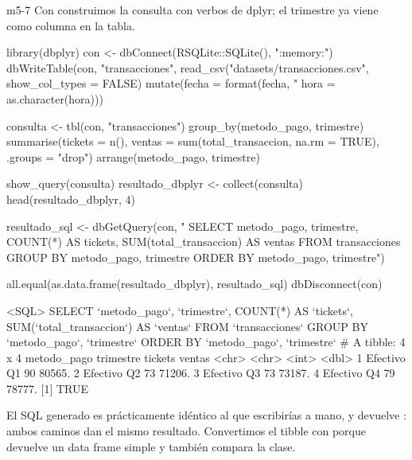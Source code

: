 \begin{solucion}{m5-7}
Con  construimos la consulta con verbos de dplyr; el
trimestre ya viene como columna en la tabla.

\begin{rcode}
library(dbplyr)
con <- dbConnect(RSQLite::SQLite(), ":memory:")
dbWriteTable(con, "transacciones",
             read_csv("datasets/transacciones.csv",
                      show_col_types = FALSE) %
               mutate(fecha = format(fecha, "%
                      hora = as.character(hora)))

consulta <- tbl(con, "transacciones") %
  group_by(metodo_pago, trimestre) %
  summarise(tickets = n(),
            ventas  = sum(total_transaccion, na.rm = TRUE),
            .groups = "drop") %
  arrange(metodo_pago, trimestre)

show_query(consulta)
resultado_dbplyr <- collect(consulta)
head(resultado_dbplyr, 4)

resultado_sql <- dbGetQuery(con, "
  SELECT metodo_pago, trimestre, COUNT(*) AS tickets,
         SUM(total_transaccion) AS ventas
  FROM transacciones
  GROUP BY metodo_pago, trimestre
  ORDER BY metodo_pago, trimestre")

all.equal(as.data.frame(resultado_dbplyr), resultado_sql)
dbDisconnect(con)
\end{rcode}

\begin{rsalida}
<SQL>
SELECT
  `metodo_pago`,
  `trimestre`,
  COUNT(*) AS `tickets`,
  SUM(`total_transaccion`) AS `ventas`
FROM `transacciones`
GROUP BY `metodo_pago`, `trimestre`
ORDER BY `metodo_pago`, `trimestre`
# A tibble: 4 x 4
  metodo_pago trimestre tickets ventas
  <chr>       <chr>       <int>  <dbl>
1 Efectivo    Q1             90 80565.
2 Efectivo    Q2             73 71206.
3 Efectivo    Q3             73 73187.
4 Efectivo    Q4             79 78777.
[1] TRUE
\end{rsalida}

El SQL generado es prácticamente idéntico al que escribirías a mano, y
 devuelve : ambos caminos dan el mismo
resultado. Convertimos el tibble con  porque
 devuelve un data frame simple y 
también compara la clase.
\end{solucion}

